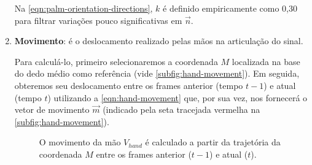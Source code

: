 \begin{enumerate}
          Na \autoref{eqn:palm-orientation-directions}, \(k\) é definido empiricamente como 0,30 para filtrar variações pouco significativas em \(\overrightarrow{n}\).


    \item \textbf{Movimento}: é o deslocamento realizado pelas mãos na articulação do sinal.

          Para calculá-lo, primeiro selecionaremos a coordenada \(M\) localizada na base do dedo médio como referência (vide \autoref{subfig:hand-movement}).
          Em seguida, obteremos seu deslocamento entre os frames anterior (tempo \(t-1\)) e atual (tempo \(t\)) utilizando a \autoref{eqn:hand-movement} que, por sua vez, nos fornecerá o vetor de movimento \(\overrightarrow{m}\) (indicado pela seta tracejada vermelha na \autoref{subfig:hand-movement}).

          \begin{figure}[ht!]
              \centering
              \caption{
                  \textmd{
                      O movimento da mão \(V_{hand}\) é calculado a partir da trajetória da coordenada \(M\) entre os frames anterior (\(t-1\)) e atual (\(t\)).
                  }
              }
              \hspace{1cm}
              \nomefonte{}
              \label{fig:hand-movement-directions}
          \end{figure}


\end{enumerate}
